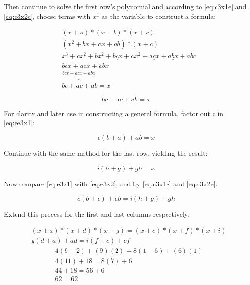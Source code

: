 \documentclass[a4paper]{article}
\begin{document}
Then continue to solve the first row's polynomial and according to \eqref{eq:c3x1e} and \eqref{eq:c3x2e}, choose terms with $x^1$ as the variable to construct a formula:

\begin{equation*} \begin{aligned}
& (x + a) * (x + b) * (x + c) \\
& (x^2 + bx + ax + ab) * (x + c) \\
& x^3 + cx^2 + bx^2 + \underline{bcx} + ax^2 + \underline{acx} + \underline{abx} + abc \\
& bcx + acx + abx \\
& \frac{bcx + acx + abx}{x} \\
& bc + ac + ab = x
\end{aligned} \end{equation*}

\begin{equation}
bc + ac + ab = x \label{eq:ee3x1}
\end{equation}

For clarity and later use in constructing a general formula, factor out c in \eqref{eq:ee3x1}:

\begin{equation} \label{eq:e3x1}
c(b + a) + ab = x
\end{equation}

Continue with the same method for the last row, yielding the result:

\begin{equation} \label{eq:e3x2}
i(h + g) + gh = x
\end{equation}

Now compare \eqref{eq:e3x1} with \eqref{eq:e3x2}, and by \eqref{eq:c3x1e} and \eqref{eq:c3x2e}:

\begin{equation}
c(b + c) + ab = i(h + g) + gh
\end{equation}

Extend this process for the first and last columns respectively:

\begin{equation*} \begin{aligned}
& (x + a) * (x + d) * (x + g) = (x + c) * (x + f) * (x + i) \\
& g(d + a) + ad = i(f + c) + cf
\end{aligned} \end{equation*}
\begin{equation*} \begin{aligned}
& 4(9 + 2) + (9)(2) = 8(1 + 6) + (6)(1) \\
& 4(11) + 18 = 8(7) + 6 \\
& 44 + 18 = 56 + 6 \\
& 62 = 62
\end{aligned} \end{equation*}
\end{document}
